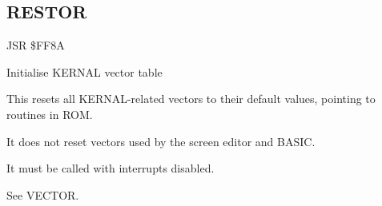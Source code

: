 
\newpage
\subsection{RESTOR}
\label{KERNAL Jump Table!RESTOR}
\begin{description}[leftmargin=2cm,style=nextline]
    \item [Address:] JSR \$FF8A
    \item [Description:] Initialise KERNAL vector table
    \item [Remarks:]
        This resets all KERNAL-related vectors to their default values, pointing to routines in ROM.

        It does not reset vectors used by the screen editor and BASIC.

        It must be called with interrupts disabled.

        See VECTOR.
    \item [Example:]
\end{description}



\newpage
